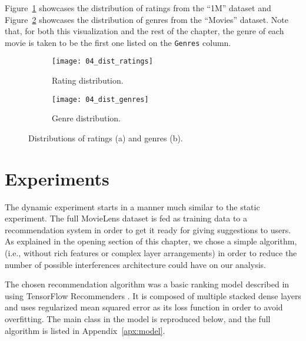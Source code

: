 Figure~\ref{fig:fig04_dist_ratings} showcases the distribution of ratings from
the ``1M'' dataset and Figure~\ref{fig:fig04_dist_genres} showcases the
distribution of genres from the ``Movies'' dataset. Note that, for both this
visualization and the rest of the chapter, the genre of each movie is taken to
be the first one listed on the \verb|Genres| column.

\begin{figure}
  \centering
  \begin{subfigure}{0.45\textwidth}
    \centering
    \texttt{[image: 04\_dist\_ratings]}
    \caption{Rating distribution.\label{fig:fig04_dist_ratings}}
  \end{subfigure}
  \begin{subfigure}{0.45\textwidth}
    \centering
    \texttt{[image: 04\_dist\_genres]}
    \caption{Genre distribution.\label{fig:fig04_dist_genres}}
  \end{subfigure}
  \caption{Distributions of ratings (a) and genres
  (b).\label{fig:fig04_dist_both}}
\end{figure}

\section{Experiments}
\label{sec:experiments04}

The dynamic experiment starts in a manner much similar to the static experiment.
The full MovieLens dataset is fed as training data to a recommendation system in
order to get it ready for giving suggestions to users. As explained in the
opening section of this chapter, we chose a simple algorithm, (i.e., without
rich features or complex layer arrangements) in order to reduce the number of
possible interferences architecture could have on our analysis.

The chosen recommendation algorithm was a basic ranking model described in
\citet{noauthor_recommending_nodate} using TensorFlow Recommenders
\citep{noauthor_tensorflow_nodate}. It is composed of multiple stacked dense
layers and uses regularized mean squared error as its loss function in order to
avoid overfitting. The main class in the model is reproduced below, and the full
algorithm is listed in Appendix~\ref{apx:model}.

